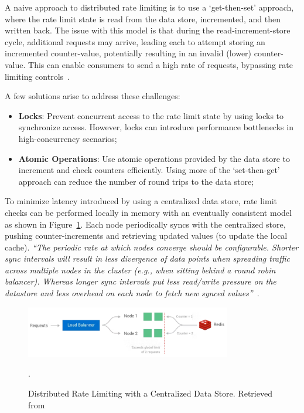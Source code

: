 A naive approach to distributed rate limiting is to use a `get-then-set' approach,
where the rate limit state is read from the data store, incremented, and then written back.
The issue with this model is that during the read-increment-store cycle, additional requests may arrive, leading each to attempt storing an incremented counter-value, potentially resulting in an invalid (lower) counter-value. This can enable consumers to send a high rate of requests, bypassing rate limiting controls~\cite{kong-rate-limiting}.

A few solutions arise to address these challenges:

\begin{itemize}
    \item \textbf{Locks}: Prevent concurrent access to the rate limit state by using locks to synchronize access.
    However, locks can introduce performance bottlenecks in high-concurrency scenarios;
    \item \textbf{Atomic Operations}:
    Use atomic operations provided by the data store to increment and check counters efficiently.
    Using more of the `set-then-get' approach can reduce the number of round trips to the data store;
\end{itemize}

To minimize latency introduced by using a centralized data store,
rate limit checks can be performed locally in memory with an eventually consistent model as shown in Figure~\ref{fig:distributed-rate-limiting-centralized}.
Each node periodically syncs with the centralized store,
pushing counter-increments and retrieving updated values (to update the local cache).
\textit{\enquote{The periodic rate at which nodes converge should be configurable. Shorter sync intervals will result in less divergence of data points when spreading traffic across multiple nodes in the cluster (e.g., when sitting behind a round robin balancer). Whereas longer sync intervals put less read/write pressure on the datastore and less overhead on each node to fetch new synced values}}~\cite{kong-rate-limiting}.

\begin{figure}[!htb]
    \centering
    \includegraphics[width=0.8\textwidth]{../figures/06_distributed_rate_limiting}
    \caption{Distributed Rate Limiting with a Centralized Data Store.
    Retrieved from~\cite{kong-rate-limiting}}.
    \label{fig:distributed-rate-limiting-centralized}
\end{figure}


